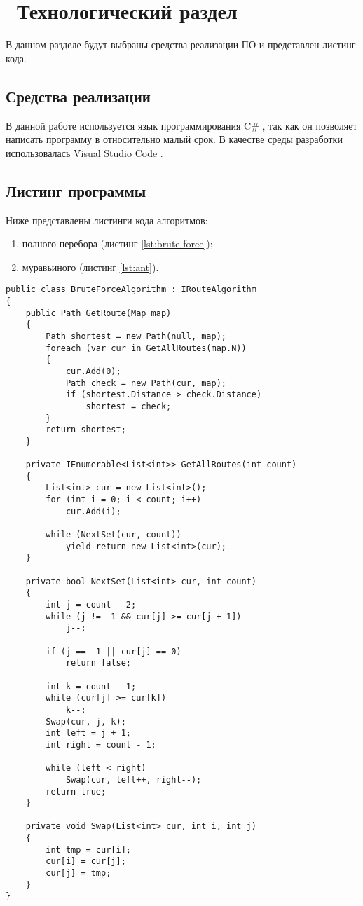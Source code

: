 \chapter{ Технологический раздел}
\label{cha:technological}

    В данном разделе будут выбраны средства реализации ПО и представлен листинг кода. 

    \section{Средства реализации}
        В данной работе используется язык программирования C\# \cite{csharp}, так как
        он позволяет написать программу в относительно малый срок.
        В качестве среды разработки использовалась Visual Studio Code \cite{visual-studio-code}. 

    \section{Листинг программы}
        Ниже представлены листинги кода алгоритмов:
        \begin{enumerate}
            \item полного перебора (листинг \ref{lst:brute-force});
            \item муравьиного (листинг \ref{lst:ant}).
        \end{enumerate}
        
        \begin{lstlisting}[language={[Sharp]C}, label=lst:brute-force, caption=Реализация алгоритма поиска полным перебором]
public class BruteForceAlgorithm : IRouteAlgorithm
{
    public Path GetRoute(Map map)
    {
        Path shortest = new Path(null, map);
        foreach (var cur in GetAllRoutes(map.N))
        {
            cur.Add(0);
            Path check = new Path(cur, map);
            if (shortest.Distance > check.Distance)
                shortest = check;
        }
        return shortest;
    }

    private IEnumerable<List<int>> GetAllRoutes(int count)
    {
        List<int> cur = new List<int>();
        for (int i = 0; i < count; i++)
            cur.Add(i);

        while (NextSet(cur, count))
            yield return new List<int>(cur);
    }

    private bool NextSet(List<int> cur, int count)
    {
        int j = count - 2;
        while (j != -1 && cur[j] >= cur[j + 1]) 
            j--;

        if (j == -1 || cur[j] == 0)
            return false;

        int k = count - 1;
        while (cur[j] >= cur[k])
            k--;
        Swap(cur, j, k);
        int left = j + 1;
        int right = count - 1;

        while (left < right)
            Swap(cur, left++, right--);
        return true;
    }

    private void Swap(List<int> cur, int i, int j)
    {
        int tmp = cur[i];
        cur[i] = cur[j];
        cur[j] = tmp;
    }
}
        \end{lstlisting}

